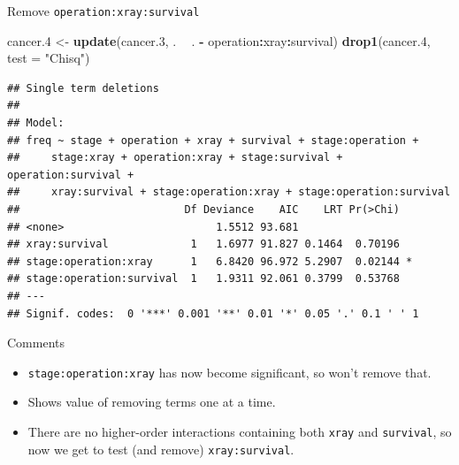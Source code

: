 \documentclass[ignorenonframetext,]{beamer}
\newenvironment{Shaded}{\begin{snugshade}}{\end{snugshade}}
\newcommand{\DataTypeTok}[1]{\textcolor[rgb]{0.13,0.29,0.53}{#1}}
\newcommand{\FloatTok}[1]{\textcolor[rgb]{0.00,0.00,0.81}{#1}}
\newcommand{\KeywordTok}[1]{\textcolor[rgb]{0.13,0.29,0.53}{\textbf{#1}}}
\newcommand{\NormalTok}[1]{#1}
\newcommand{\OperatorTok}[1]{\textcolor[rgb]{0.81,0.36,0.00}{\textbf{#1}}}
\newcommand{\StringTok}[1]{\textcolor[rgb]{0.31,0.60,0.02}{#1}}
\begin{document}
\begin{frame}[fragile]{Remove \texttt{operation:xray:survival}}
\protect\hypertarget{remove-operationxraysurvival}{}

\scriptsize

\begin{Shaded}
\begin{Highlighting}[]
\NormalTok{cancer}\FloatTok{.4}\NormalTok{ <-}\StringTok{ }\KeywordTok{update}\NormalTok{(cancer}\FloatTok{.3}\NormalTok{, . }\OperatorTok{~}\StringTok{ }\NormalTok{. }\OperatorTok{-}\StringTok{ }\NormalTok{operation}\OperatorTok{:}\NormalTok{xray}\OperatorTok{:}\NormalTok{survival)}
\KeywordTok{drop1}\NormalTok{(cancer}\FloatTok{.4}\NormalTok{, }\DataTypeTok{test =} \StringTok{"Chisq"}\NormalTok{)}
\end{Highlighting}
\end{Shaded}

\begin{verbatim}
## Single term deletions
## 
## Model:
## freq ~ stage + operation + xray + survival + stage:operation + 
##     stage:xray + operation:xray + stage:survival + operation:survival + 
##     xray:survival + stage:operation:xray + stage:operation:survival
##                          Df Deviance    AIC    LRT Pr(>Chi)  
## <none>                        1.5512 93.681                  
## xray:survival             1   1.6977 91.827 0.1464  0.70196  
## stage:operation:xray      1   6.8420 96.972 5.2907  0.02144 *
## stage:operation:survival  1   1.9311 92.061 0.3799  0.53768  
## ---
## Signif. codes:  0 '***' 0.001 '**' 0.01 '*' 0.05 '.' 0.1 ' ' 1
\end{verbatim}

\normalsize

\end{frame}

\begin{frame}[fragile]{Comments}
\protect\hypertarget{comments-55}{}

\begin{itemize}
\item
  \texttt{stage:operation:xray} has now become significant, so won't
  remove that.
\item
  Shows value of removing terms one at a time.
\item
  There are no higher-order interactions containing both \texttt{xray}
  and \texttt{survival}, so now we get to test (and remove)
  \texttt{xray:survival}.
\end{itemize}

\end{frame}
\end{document}
